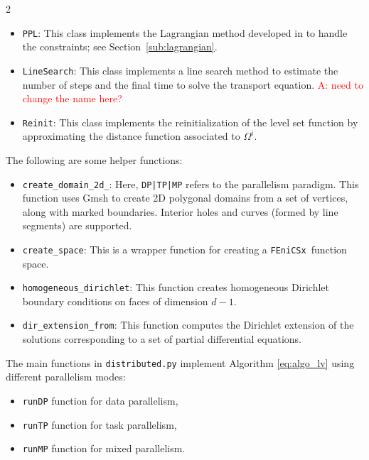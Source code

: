 \documentclass[a4paper, oneside]{article}
\newcommand{\tred}{\textcolor{red}}
\newcommand{\fx}{\texttt{FEniCSx}}
\newcommand{\code}[1]{\texttt{#1}}
\begin{document}
\begin{multicols}{2}
\begin{itemize}[left=0.0em]
\item \code{PPL}:
This class implements the Lagrangian method developed in \cite{MR4589221}
to handle the constraints; see Section~\ref{sub:lagrangian}.

\item \code{LineSearch}:
This class implements a line search method to
estimate the number of steps and the final time to
solve the transport equation.
\tred{A: need to change the name here?}

\item \code{Reinit}:
This class implements the reinitialization of the level set function
by approximating the distance function associated to $\Omega^i$.
\end{itemize}

The following are some helper functions:
\begin{itemize}[left=0.0em]
\item \code{create\_domain\_2d\_<DP|TP|MP>}:
Here, \code{DP|TP|MP} refers to the parallelism paradigm.
This function uses Gmsh to create 2D polygonal domains 
from a set of vertices, along with marked boundaries.
Interior holes and curves (formed by line segments) are supported.


\item \code{create\_space}:
This is a wrapper function for creating a \fx\ function space.

\item \code{homogeneous\_dirichlet}:
This function creates homogeneous Dirichlet boundary conditions
on faces of dimension $d-1$.

\item \code{dir\_extension\_from}:
This function computes the Dirichlet extension of the solutions
corresponding to a set of partial differential equations.
\end{itemize}

The main functions in \code{distributed.py}
implement Algorithm \ref{eq:algo_lv} using
different parallelism modes:
\begin{itemize}[left=0.0em]
\item \code{runDP} function for data parallelism,
\item \code{runTP} function for task parallelism, 
\item \code{runMP} function for mixed parallelism.
\end{itemize}


\end{multicols}
\end{document}
